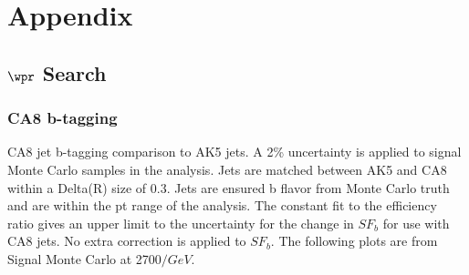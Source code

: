 \chapter{Appendix}
\label{sec:appendix}
\section{$\wpr$ Search}
\subsection{CA8 b-tagging}
\label{sec:ca8toak5}


CA8 jet b-tagging comparison to AK5 jets. A 2\% uncertainty is applied to signal Monte Carlo samples in the analysis.  Jets are matched between AK5 and CA8 
within a Delta(R) size of 0.3.
Jets are ensured b flavor from Monte Carlo truth and are within the pt range of the analysis.  The constant fit to the efficiency ratio gives an upper limit to the uncertainty 
for the change in $SF_b$ for use with CA8 jets.  No extra correction is applied to $SF_b$.  The following plots are from Signal Monte Carlo at 2700$/GeV$. 


